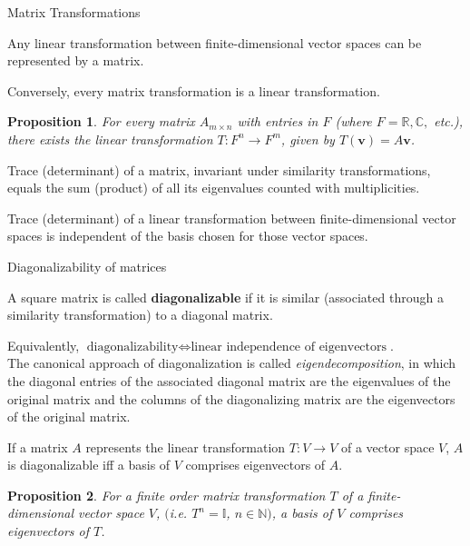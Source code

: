 \documentclass{beamer}
\newtheorem{proposition}{Proposition}
\newcommand\boldtext[1]{\textcolor{bolds}{\textbf{#1}}}
\newcommand\italictext[1]{\textcolor{italics}{\textit{#1}}}
\begin{document}
\begin{frame}{Matrix Transformations}
    \begin{lemma}
        Any linear transformation between finite-dimensional vector spaces can be represented by a matrix.
    \end{lemma}
    Conversely, every matrix transformation is a linear transformation.
    \begin{proposition}
        For every matrix $A_{m\times n}$ with entries in $F$ (where $F=\mathbb{R}, \mathbb{C},$ etc.), there exists the linear transformation $T:F^n\xrightarrow{}F^m$, given by $T(\mathbf{v})=A\mathbf{v}$.
    \end{proposition}
    \begin{lemma}
        Trace (determinant) of a matrix, invariant under similarity transformations, equals the sum (product) of all its eigenvalues counted with multiplicities.
    \end{lemma}
    \begin{corollary}
        Trace (determinant) of a linear transformation between finite-dimensional vector spaces is independent of the basis chosen for those vector spaces.
    \end{corollary}
\end{frame}

\begin{frame}{Diagonalizability of matrices}
    \begin{definition}
        A square matrix is called \boldtext{diagonalizable} if it is similar (associated through a similarity transformation) to a diagonal matrix.
    \end{definition}
    Equivalently, $\text{diagonalizability}\iff\text{linear independence of eigenvectors}$.\\
    The canonical approach of diagonalization is called \italictext{eigendecomposition}, in which the diagonal entries of the associated diagonal matrix are the eigenvalues of the original matrix and the columns of the diagonalizing matrix are the eigenvectors of the original matrix.
    \begin{lemma}
        If a matrix $A$ represents the linear transformation $T:V\xrightarrow{}V$ of a vector space $V$, $A$ is diagonalizable iff a basis of $V$ comprises eigenvectors of $A$.
    \end{lemma}
    \begin{proposition}
        For a finite order matrix transformation $T$ of a finite-dimensional vector space $V$, $($i.e. $T^n=\mathbb{I}$, $n\in\mathbb{N})$, a basis of $V$ comprises eigenvectors of $T$.
    \end{proposition}
\end{frame}
\end{document}

